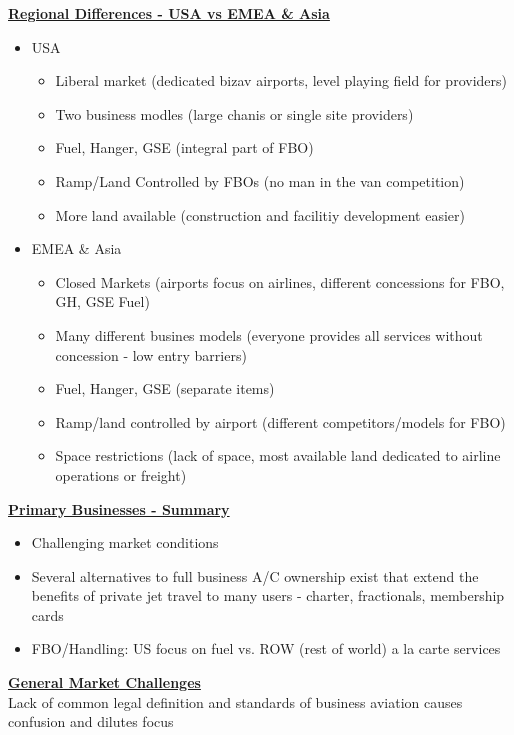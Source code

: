 \documentclass[9pt, landscape, fleqn]{scrartcl}
\begin{document}
\begin{multicols*}{3}
\begin{itemize}
\end{itemize}
\underline{\textbf{Regional Differences - USA vs EMEA \& Asia}}
\begin{itemize}
    \item USA 
    \begin{itemize}
        \item Liberal market (dedicated bizav airports, level playing field for providers)
        \item Two business modles (large chanis or single site providers)
        \item Fuel, Hanger, GSE (integral part of FBO)
        \item Ramp/Land Controlled by FBOs (no man in the van competition)
        \item More land available (construction and facilitiy development easier)
    \end{itemize}
    \item EMEA \& Asia 
    \begin{itemize}
        \item Closed Markets (airports focus on airlines, different concessions for FBO, GH, GSE Fuel)
        \item Many different busines models (everyone provides all services without concession - low entry barriers)
        \item Fuel, Hanger, GSE (separate items)
        \item Ramp/land controlled by airport (different competitors/models for FBO)
        \item Space restrictions (lack of space, most available land dedicated to airline operations or freight)
    \end{itemize}
\end{itemize}
\underline{\textbf{Primary Businesses - Summary}}
\begin{itemize}
    \item Challenging market conditions
    \item Several alternatives to full business A/C ownership exist that extend the benefits of private jet travel to many users - charter, fractionals, membership cards 
    \item FBO/Handling: US focus on fuel vs. ROW (rest of world) a la carte services 
\end{itemize}
\underline{\textbf{General Market Challenges}} \\ 
Lack of common legal definition and standards of business aviation causes confusion and dilutes focus
\begin{itemize}

\end{itemize}
\end{multicols*}
\end{document}
